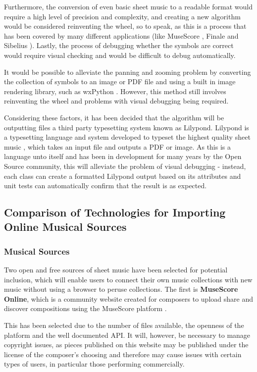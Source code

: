 Furthermore, the conversion of even basic sheet music to a readable format would require a high level of precision and complexity, and creating a new algorithm would be considered reinventing the wheel, so to speak, as this is a process that has been covered by many different applications (like MuseScore \parencite{MuseTour}, Finale \parencite{mxml} and Sibelius \parencite{avid}). 
Lastly, the process of debugging whether the symbols are correct would require visual checking and would be difficult to debug automatically.

It would be possible to alleviate the panning and zooming problem by converting the collection of symbols to an image or PDF file and using a built in image rendering library, such as wxPython \parencite{WX}. However, this method still involves reinventing the wheel and problems with visual debugging being required.

Considering these factors, it has been decided that the algorithm will be outputting files a third party typesetting system known as Lilypond. Lilypond is a typesetting language and system developed to typeset the highest quality sheet music \parencite{Lilypond}, which takes an input file and outputs a PDF or image. As this is a language unto itself and has been in development for many years by the Open Source community, this will alleviate the problem of visual debugging - instead, each class can create a formatted Lilypond output based on its attributes and unit tests can automatically confirm that the result is as expected.


\subsection{Comparison of Technologies for Importing Online Musical Sources}
\subsubsection{Musical Sources}
Two open and free sources of sheet music have been selected for potential inclusion, which will enable users to connect their own music collections with new music without using a browser to peruse collections. The first is \textbf{MuseScore Online}, which is a community website created for composers to upload share and discover compositions using the MuseScore platform \parencite{MuseShare}.

This has been selected due to the number of files available, the openness of the platform and the well documented API. It will, however, be necessary to manage copyright issues, as pieces published on this website may be published under the license of the composer's choosing and therefore may cause issues with certain types of users, in particular those performing commercially.

